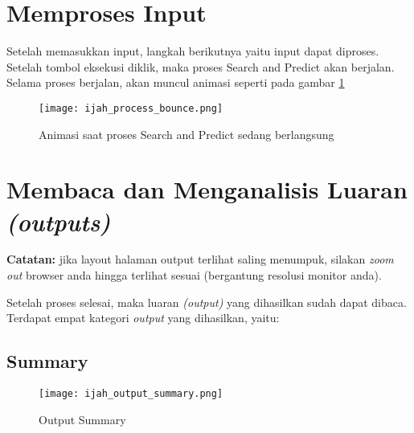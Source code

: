 \section{Memproses Input} \label{process}
Setelah memasukkan input, langkah berikutnya yaitu input dapat diproses. Setelah tombol eksekusi diklik, maka proses Search and Predict akan berjalan. Selama proses berjalan, akan muncul animasi seperti pada gambar \ref{fig:ijah_process_bounce}

\begin{figure}[H]
	\centering
	\texttt{[image: ijah\_process\_bounce.png]}
	\caption{Animasi saat proses Search and Predict sedang berlangsung}
	\label{fig:ijah_process_bounce}
	\end{figure}

\section{Membaca dan Menganalisis Luaran \emph{(outputs)}}
\textbf{Catatan:} jika layout halaman output terlihat saling menumpuk, silakan \emph{zoom out} browser anda hingga terlihat sesuai (bergantung resolusi monitor anda).

Setelah proses selesai, maka luaran \emph{(output)} yang dihasilkan sudah dapat dibaca. Terdapat empat kategori \emph{output} yang dihasilkan, yaitu:

	\subsection{Summary} \label{summary}
	\begin{figure}[H]
	\centering
	\texttt{[image: ijah\_output\_summary.png]}
	\caption{Output Summary}
	\label{fig:ijah_output_summary}
	\end{figure}

